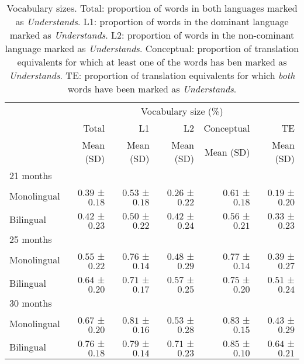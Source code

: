 \documentclass[
  letterpaper,
  DIV=11,
  numbers=noendperiod]{scrartcl}
\begin{document}
\hypertarget{tbl-vocabulary}{}
\begin{longtable}{l|rrrrr}
\caption{\label{tbl-vocabulary}Vocabulary sizes. Total: proportion of words in both languages marked as
\emph{Understands}. L1: proportion of words in the dominant language
marked as \emph{Understands}. L2: proportion of words in the
non-cominant language marked as \emph{Understands}. Conceptual:
proportion of translation equivalents for which at least one of the
words has ben marked as \emph{Understands}. TE: proportion of
translation equivalents for which \emph{both} words have been marked as
\emph{Understands}. }\tabularnewline

\toprule
\multicolumn{1}{l}{} & \multicolumn{5}{c}{Vocabulary size (\%)} \\ 
\cmidrule(lr){2-6}
\multicolumn{1}{l}{} & Total  & L1 & L2 & Conceptual & TE \\ 
\cmidrule(lr){2-2} \cmidrule(lr){3-3} \cmidrule(lr){4-4} \cmidrule(lr){5-5} \cmidrule(lr){6-6}
\multicolumn{1}{l}{} & Mean (SD) & Mean (SD) & Mean (SD) & Mean (SD) & Mean (SD) \\ 
\midrule
\multicolumn{6}{l}{21 months} \\ 
\midrule
\hspace*{10px} Monolingual & $0.39$ ± $0.18$ & $0.53$ ± $0.18$ & $0.26$ ± $0.22$ & $0.61$ ± $0.18$ & $0.19$ ± $0.20$ \\ 
\hspace*{10px} Bilingual & $0.42$ ± $0.23$ & $0.50$ ± $0.22$ & $0.42$ ± $0.24$ & $0.56$ ± $0.21$ & $0.33$ ± $0.23$ \\ 
\midrule
\multicolumn{6}{l}{25 months} \\ 
\midrule
\hspace*{10px} Monolingual & $0.55$ ± $0.22$ & $0.76$ ± $0.14$ & $0.48$ ± $0.29$ & $0.77$ ± $0.14$ & $0.39$ ± $0.27$ \\ 
\hspace*{10px} Bilingual & $0.64$ ± $0.20$ & $0.71$ ± $0.17$ & $0.57$ ± $0.25$ & $0.75$ ± $0.20$ & $0.51$ ± $0.24$ \\ 
\midrule
\multicolumn{6}{l}{30 months} \\ 
\midrule
\hspace*{10px} Monolingual & $0.67$ ± $0.20$ & $0.81$ ± $0.16$ & $0.53$ ± $0.28$ & $0.83$ ± $0.15$ & $0.43$ ± $0.29$ \\ 
\hspace*{10px} Bilingual & $0.76$ ± $0.18$ & $0.79$ ± $0.14$ & $0.71$ ± $0.23$ & $0.85$ ± $0.10$ & $0.64$ ± $0.21$ \\ 
\bottomrule
\end{longtable}
\end{document}
